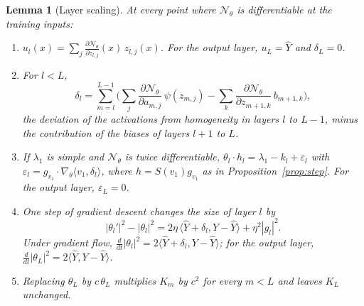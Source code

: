 \documentclass[11pt]{article}
\newtheorem{lemma}{Lemma}
\theoremstyle{definition}
\theoremstyle{remark}
\newcommand{\Net}{\mathcal{N}_\theta}
\newcommand{\ip}[2]{\langle #1,#2\rangle}
\begin{document}
\begin{lemma}[Layer scaling]\label{lem:euler}
At every point where $\Net$ is differentiable at the training inputs:
\begin{enumerate}[label=(\alph*)]
\item $u_l(x) = \sum_j\frac{\partial\Net}{\partial z_{l,j}}(x)\,z_{l,j}(x)$. For the output layer, $u_L = \hat Y$ and $\delta_L = 0$.
\item For $l < L$,
\begin{equation}\label{eq:delta}
\delta_l = \sum_{m=l}^{L-1}\Big(\sum_j\frac{\partial\Net}{\partial a_{m,j}}\,\psi(z_{m,j}) - \sum_k\frac{\partial\Net}{\partial z_{m+1,k}}\,b_{m+1,k}\Big),
\end{equation}
the deviation of the activations from homogeneity in layers $l$ to $L-1$, minus the contribution of the biases of layers $l+1$ to $L$.
\item If $\lambda_1$ is simple and $\Net$ is twice differentiable, $\theta_l\cdot h_l = \lambda_1 - k_l + \varepsilon_l$ with $\varepsilon_l = g_{v_1}\cdot\nabla_\theta\ip{v_1}{\delta_l}$, where $h = S(v_1)g_{v_1}$ as in Proposition~\ref{prop:step}. For the output layer, $\varepsilon_L = 0$.
\item One step of gradient descent changes the size of layer $l$ by
\begin{equation}\label{eq:norms}
|\theta_l'|^2 - |\theta_l|^2 = 2\eta\,\ip{\hat Y + \delta_l}{Y - \hat Y} + \eta^2|g_l|^2 .
\end{equation}
Under gradient flow, $\frac{d}{dt}|\theta_l|^2 = 2\ip{\hat Y + \delta_l}{Y - \hat Y}$; for the output layer, $\frac{d}{dt}|\theta_L|^2 = 2\ip{\hat Y}{Y - \hat Y}$.
\item Replacing $\theta_L$ by $c\,\theta_L$ multiplies $K_m$ by $c^2$ for every $m < L$ and leaves $K_L$ unchanged.
\end{enumerate}
\end{lemma}
\end{document}
